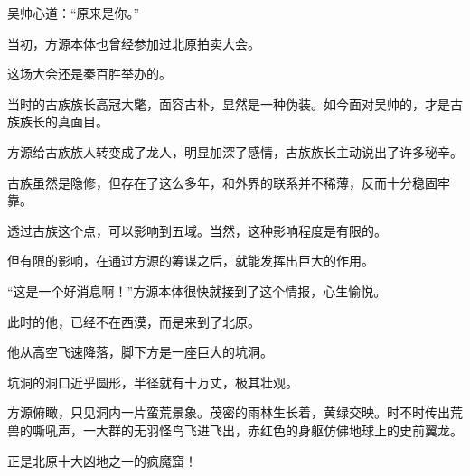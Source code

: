\begin{this_body}
吴帅心道：“原来是你。”

当初，方源本体也曾经参加过北原拍卖大会。

这场大会还是秦百胜举办的。

当时的古族族长高冠大氅，面容古朴，显然是一种伪装。如今面对吴帅的，才是古族族长的真面目。

方源给古族族人转变成了龙人，明显加深了感情，古族族长主动说出了许多秘辛。

古族虽然是隐修，但存在了这么多年，和外界的联系并不稀薄，反而十分稳固牢靠。

透过古族这个点，可以影响到五域。当然，这种影响程度是有限的。

但有限的影响，在通过方源的筹谋之后，就能发挥出巨大的作用。

“这是一个好消息啊！”方源本体很快就接到了这个情报，心生愉悦。

此时的他，已经不在西漠，而是来到了北原。

他从高空飞速降落，脚下方是一座巨大的坑洞。

坑洞的洞口近乎圆形，半径就有十万丈，极其壮观。

方源俯瞰，只见洞内一片蛮荒景象。茂密的雨林生长着，黄绿交映。时不时传出荒兽的嘶吼声，一大群的无羽怪鸟飞进飞出，赤红色的身躯仿佛地球上的史前翼龙。

正是北原十大凶地之一的疯魔窟！

\end{this_body}

